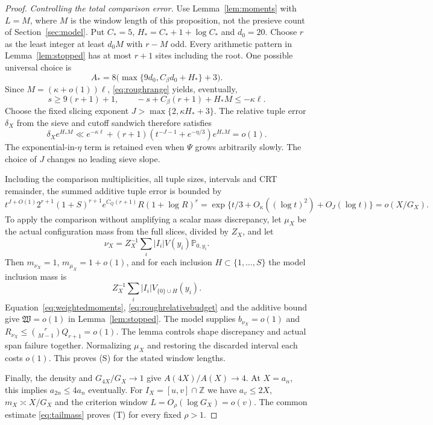 \documentclass[11pt,a4paper]{article}
\newcommand{\Prob}{\mathbb P}
\newcommand{\Z}{\mathbb Z}
\begin{document}
\begin{proof}
\smallskip\noindent\emph{Controlling the total comparison error.}
Use Lemma~\ref{lem:moments} with $L=M$, where $M$ is the window length
of this proposition, not the presieve count of Section~\ref{sec:model}.
Put $C_*=5$, $H_*=C_*+1+\log C_*$ and $d_0=20$.
Choose $r$ as the least integer at least $d_0M$ with $r-M$ odd.
Every arithmetic pattern in Lemma~\ref{lem:stopped} has at most $r+1$
sites including the root. One possible universal choice is
\[
 A_*=8\bigl(\max\{9d_0,C_\beta d_0+H_*\}+3\bigr).
\]
Since $M=(\kappa+o(1))\ell$, \eqref{eq:roughrange} yields, eventually,
\[
 s\ge9(r+1)+1,\qquad -s+C_\beta(r+1)+H_*M\le-\kappa\ell.
\]
Choose the fixed slicing exponent $J>\max\{2,\kappa H_*+3\}$.
The relative tuple error $\delta_X$ from the sieve and cutoff sandwich
therefore satisfies
\begin{equation}\label{eq:roughrelativebudget}
 \delta_Xe^{H_*M}\ll
 e^{-\kappa\ell}+
 (r+1)(t^{-J-1}+e^{-\eta/3})e^{H_*M}=o(1).
\end{equation}
The exponential-in-$\eta$ term is retained even when $\Psi$ grows
arbitrarily slowly. The choice of $J$ changes no leading sieve slope.

Including the comparison multiplicities, all tuple sizes, intervals and CRT
remainder, the summed additive tuple error is bounded by
\[
 t^{J+O(1)}2^{r+1}(1+S)^{r+1}e^{C_Q(r+1)}
 R(1+\log R)^r
       =\exp\{t/3+O_\kappa((\log t)^2)+O_J(\log t)\}
       =o(X/G_X).
\]
To apply the comparison without amplifying a scalar mass discrepancy,
let $\mu_X$ be the actual configuration mass from the full slices,
divided by $Z_X$, and let
\[
 \nu_X=Z_X^{-1}\sum_i|I_i|V(y_i)\Prob_{0,y_i}.
\]
Then $m_{\nu_X}=1$, $m_{\mu_X}=1+o(1)$, and for each inclusion
$H\subset\{1,\ldots,S\}$ the model inclusion mass is
\[
                  Z_X^{-1}\sum_i|I_i|V_{\{0\}\cup H}(y_i).
\]
Equation~\eqref{eq:weightedmoments}, \eqref{eq:roughrelativebudget}
and the additive bound give $\mathfrak W=o(1)$ in Lemma~\ref{lem:stopped}.
The model supplies $b_{\nu_X}=o(1)$ and
$R_{\nu_X}\le\binom r{M-1}Q_{r+1}=o(1)$.
The lemma controls shape discrepancy and actual span failure together.
Normalizing $\mu_X$ and restoring the discarded interval each costs
$o(1)$. This proves (S) for the stated window lengths.

Finally, the density and $G_{4X}/G_X\to1$ give $A(4X)/A(X)\to4$.
At $X=a_n$, this implies $a_{2n}\le4a_n$ eventually.
For $I_X=[u,v]\cap\Z$ we have $a_v\le2X$,
$m_X\asymp X/G_X$ and the criterion window $L=O_\rho(\log G_X)=o(v)$.
The common estimate
\eqref{eq:tailmass} proves (T) for every fixed $\rho>1$.
\end{proof}
\end{document}
